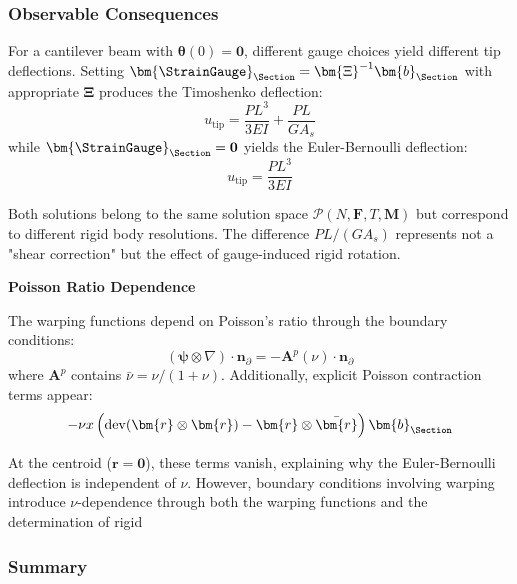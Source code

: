 \begin{Quote}
\subsubsection{Observable Consequences}

For a cantilever beam with $\bm{\theta}(0) = \mathbf{0}$, different gauge choices yield different tip deflections. Setting $\bm{\StrainGauge}_{\Section} = \bm{\Xi}^{-1}\bm{b}_{\Section}$ with appropriate $\bm{\Xi}$ produces the Timoshenko deflection:
\begin{equation*}
u_{\mathrm{tip}} = \frac{PL^3}{3EI} + \frac{PL}{GA_s}
\end{equation*}
while $\bm{\StrainGauge}_{\Section} = \mathbf{0}$ yields the Euler-Bernoulli deflection:
\begin{equation*}
u_{\mathrm{tip}} = \frac{PL^3}{3EI}
\end{equation*}

Both solutions belong to the same solution space $\mathcal{P}(N,\mathbf{F},T,\mathbf{M})$ but correspond to different rigid body resolutions. 
The difference $PL/(GA_s)$ represents not a "shear correction" but the effect of gauge-induced rigid rotation.
\end{Quote}

\begin{Quote}
\textbf{Poisson Ratio Dependence}

The warping functions depend on Poisson's ratio through the boundary conditions:
\begin{equation*}
(\bm{\psi} \otimes \nabla) \cdot \mathbf{n}_{\partial} = -\mathbf{A}^p(\nu) \cdot \mathbf{n}_{\partial}
\end{equation*}
where $\mathbf{A}^p$ contains $\bar{\nu} = \nu/(1+\nu)$. Additionally, explicit Poisson contraction terms appear:
\begin{equation*}
-\nu x\left(\mathrm{dev}(\bm{r}\otimes\bm{r}) - \bm{r}\otimes\bar{\bm{r}}\right)\bm{b}_{\Section}
\end{equation*}

At the centroid ($\bm{r} = \mathbf{0}$), these terms vanish, explaining why the Euler-Bernoulli deflection is independent of $\nu$. 
However, boundary conditions involving warping introduce $\nu$-dependence through both the warping functions and the determination of rigid
\end{Quote}

\subsubsection{Summary}


